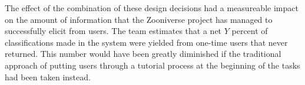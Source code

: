 \documentclass{sigchi}
\begin{document}
The effect of the combination of these design decisions had a measureable impact on the amount of information that the Zooniverse project has managed to successfully elicit from users.  The team estimates that a net $Y$ percent of classifications made in the system were yielded from one-time users that never returned.  This number would have been greatly diminished if the traditional approach of putting users through a tutorial process at the beginning of the tasks had been taken instead.





\end{document}
